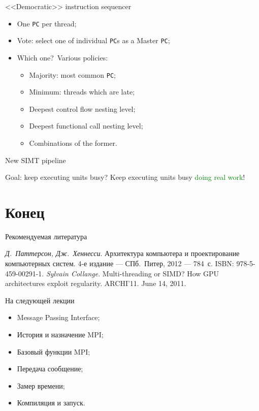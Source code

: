 \begin{frame}{<<Democratic>> instruction sequencer}
\begin{itemize}
    \item One \texttt{PC} per thread;\pause
    \item Vote: select one of individual \texttt{PC}s as a Master \texttt{PC};\pause
    \item Which one?\pause~Various policies:
    \begin{itemize}
        \item Majority: most common \texttt{PC};
        \item Minimum: threads which are late;
        \item Deepest control flow  nesting level;
        \item Deepest functional call nesting level;
        \item Combinations of the former.
    \end{itemize}
\end{itemize}
\end{frame}

\begin{frame}{New SIMT pipeline}
\centering
{}
\end{frame}

\begin{frame}
Goal: keep executing units busy?
\pause\vfill
Keep executing units busy \textcolor{green}{doing real work}!
\end{frame}

\section*{Конец}

\begin{frame}{Рекомендуемая литература}
\begin{thebibliography}{99}
    \bibitem{} \textit{Д.~Паттерсон, Дж.~Хеннесси}. Архитектура компьютера и
    проектирование компьютерных систем. 4-е издание --- СПб.~Питер, 2012 ---
    784~с. ISBN: 978-5-459-00291-1.
    \bibitem{} \textit{Sylvain Collange}. Multi-threading or SIMD? How GPU
    architectures exploit regularity. ARCHI'11. June 14, 2011.
    \end{thebibliography}
\end{frame}

\begin{frame}{На следующей лекции}
\begin{itemize}
    \item Message Passing Interface;
    \item История и назначение MPI;
    \item Базовый функции MPI;
    \item Передача сообщение;
    \item Замер времени;
    \item Компиляция и запуск.
\end{itemize}
\end{frame}

